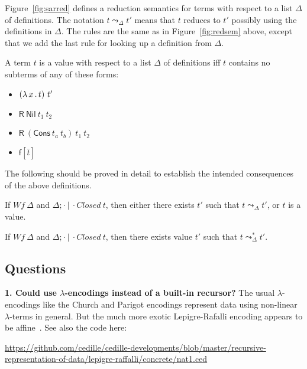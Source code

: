 \documentclass{article}
\begin{document}
Figure~\ref{fig:sarred} defines a reduction semantics for terms with
respect to a list $\Delta$ of definitions.  The notation $t \leadsto_\Delta t'$ means
that $t$ reduces to $t'$ possibly using the definitions in $\Delta$.  The rules are the same as in
Figure~\ref{fig:redsem} above, except that we add the last rule for
looking up a definition from $\Delta$.  


\begin{definition}
  A term $t$ is a value with respect to a list $\Delta$ of definitions iff $t$ contains no subterms of any of these forms:
  \begin{itemize}
  \item $(\lambda\, x\, .\, t)\ t'$
  \item $\mathsf{R}\ \mathsf{Nil}\ t_1\ t_2$
  \item $\mathsf{R}\ (\mathsf{Cons}\ t_a\ t_b)\ t_1\ t_2$
  \item $\mathsf{f}[\bar{t}]$
  \end{itemize}
\end{definition}

The following should be proved in detail to establish the intended consequences of the above definitions.

\begin{proposition}[Safety]
  If $\textit{Wf}\ \Delta$ and $\Delta;\cdot\ |\ \cdot \textit{Closed}\ t$,
  then either there exists $t'$ such that $t \leadsto_\Delta t'$, or
  $t$ is a value.
\end{proposition}

\begin{proposition}[Normalization]
  If $\textit{Wf}\ \Delta$ and $\Delta;\cdot\ |\ \cdot \textit{Closed}\ t$,
  then there exists value $t'$ such that $t \leadsto_\Delta^* t'$.
\end{proposition}

\subsection{Questions}

\textbf{1. Could \sar use $\lambda$-encodings instead of a built-in recursor?}  The
usual $\lambda$-encodings like the Church and Parigot encodings represent data
using non-linear $\lambda$-terms in general.  But the much more exotic
Lepigre-Rafalli encoding appears to be affine~\cite[Section 7]{jenkins+21}.  See
also the code here:

\url{https://github.com/cedille/cedille-developments/blob/master/recursive-representation-of-data/lepigre-raffalli/concrete/nat1.ced}
\end{document}
